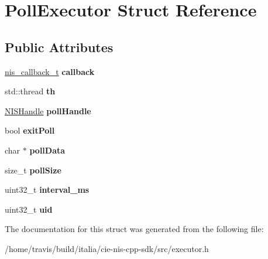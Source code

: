 \hypertarget{structPollExecutor}{\section{Poll\-Executor Struct Reference}
\label{structPollExecutor}
}
\subsection*{Public Attributes}
\begin{DoxyCompactItemize}
\item 
\hypertarget{structPollExecutor_a28319240732a17a19f78db7ff325c552}{\hyperlink{nis__types_8h_a01a69b218db702baa14290be05ef112d}{nis\-\_\-callback\-\_\-t} {\bfseries callback}}\label{structPollExecutor_a28319240732a17a19f78db7ff325c552}

\item 
\hypertarget{structPollExecutor_aedea242ce74052608ae9358ec93d70e2}{std\-::thread {\bfseries th}}\label{structPollExecutor_aedea242ce74052608ae9358ec93d70e2}

\item 
\hypertarget{structPollExecutor_ac4006982a46140b6b353c621921d171b}{\hyperlink{nis__types_8h_aeda8757494329f27e534f367b067eda3}{N\-I\-S\-Handle} {\bfseries poll\-Handle}}\label{structPollExecutor_ac4006982a46140b6b353c621921d171b}

\item 
\hypertarget{structPollExecutor_a22f382f7d74c9cae694dc7b003bb12fb}{bool {\bfseries exit\-Poll}}\label{structPollExecutor_a22f382f7d74c9cae694dc7b003bb12fb}

\item 
\hypertarget{structPollExecutor_a6a278f48537a9f9701ff687ccc2125e8}{char $\ast$ {\bfseries poll\-Data}}\label{structPollExecutor_a6a278f48537a9f9701ff687ccc2125e8}

\item 
\hypertarget{structPollExecutor_aaac2ecbce031c612792e6aea90196af4}{size\-\_\-t {\bfseries poll\-Size}}\label{structPollExecutor_aaac2ecbce031c612792e6aea90196af4}

\item 
\hypertarget{structPollExecutor_aa371cc9916044879d56ddff0a169bc0c}{uint32\-\_\-t {\bfseries interval\-\_\-ms}}\label{structPollExecutor_aa371cc9916044879d56ddff0a169bc0c}

\item 
\hypertarget{structPollExecutor_a939fe0fc384eb018f62839be04fa519d}{uint32\-\_\-t {\bfseries uid}}\label{structPollExecutor_a939fe0fc384eb018f62839be04fa519d}

\end{DoxyCompactItemize}


The documentation for this struct was generated from the following file\-:\begin{DoxyCompactItemize}
\item 
/home/travis/build/italia/cie-\/nis-\/cpp-\/sdk/src/executor.\-h\end{DoxyCompactItemize}
